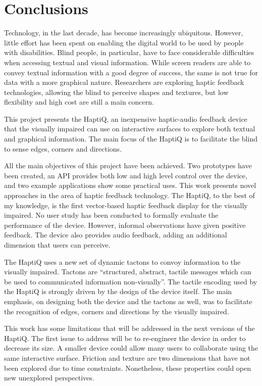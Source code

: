 \chapter{Conclusions}

Technology, in the last decade, has become increasingly ubiquitous. However, little effort has been spent on enabling the digital world to be used by people with disabilities. Blind people, in particular, have to face considerable difficulties when accessing textual and visual information. While screen readers are able to convey textual information with a good degree of success, the same is not true for data with a more graphical nature. Researchers are exploring haptic feedback technologies, allowing the blind to perceive shapes and textures, but low flexibility and high cost are still a main concern.  

This project presents the HaptiQ, an inexpensive haptic-audio feedback device that the visually impaired can use on interactive surfaces to explore both textual and graphical information. The main focus of the HaptiQ is to facilitate the blind to sense edges, corners and directions.

All the main objectives of this project have been achieved. Two prototypes have been created, an API provides both low and high level control over the device, and two example applications show some practical uses. This work presents novel approaches in the area of haptic feedback technology. The HaptiQ, to the best of my knowledge, is the first vector-based haptic feedback display for the visually impaired. No user study has been conducted to formally evaluate the performance of the device. However, informal observations have given positive feedback. The device also provides audio feedback, adding an additional dimension that users can perceive.

The HaptiQ uses a new set of dynamic tactons to convoy information to the visually impaired. Tactons are ``structured, abstract, tactile messages which can be used to communicated information non-visually''\cite{brown2005first}. The tactile encoding used by the HaptiQ is strongly driven by the design of the device itself. The main emphasis, on designing both the device and the tactons as well, was to facilitate the recognition of edges, corners and directions by the visually impaired. 

This work has some limitations that will be addressed in the next versions of the HaptiQ. The first issue to address will be to re-engineer the device in order to decrease its size. A smaller device could allow many users to collaborate using the same interactive surface. Friction and texture are two dimensions that have not been explored due to time constraints. Nonetheless, these properties could open new unexplored perspectives.   

